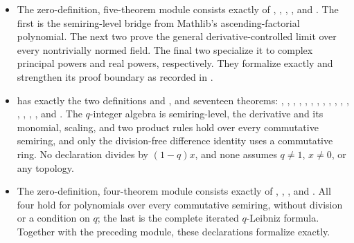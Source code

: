 \documentclass[11pt,a4paper,oneside,openany]{book}
\theoremstyle{definition}
\theoremstyle{remark}
\begin{document}
\begin{itemize}
\item The zero-definition, five-theorem module
 consists exactly of
,
,
,
, and
.  The first is the
semiring-level bridge from Mathlib's ascending-factorial polynomial.  The next
two prove the general derivative-controlled limit over every nontrivially
normed field.  The final two specialize it to complex principal powers and
real powers, respectively.  They formalize 
exactly and strengthen its proof boundary as recorded in
.

\item {} has exactly the two definitions
 and , and seventeen theorems:
,
,
,
,
,
,
,
,
,
,
,
,
,
,
,
, and
.  The \(q\)-integer algebra is semiring-level,
the derivative and its monomial, scaling, and two product rules hold over
every commutative semiring, and only the division-free difference identity
uses a commutative ring.  No declaration divides by \((1-q)x\), and none
assumes \(q\ne1\), \(x\ne0\), or any topology.

\item The zero-definition, four-theorem module
 consists exactly of
,
,
, and
.  All four hold for polynomials over
every commutative semiring, without division or a condition on \(q\); the
last is the complete iterated \(q\)-Leibniz formula.  Together with the
preceding module, these declarations formalize
 exactly.


\end{itemize}
\end{document}
